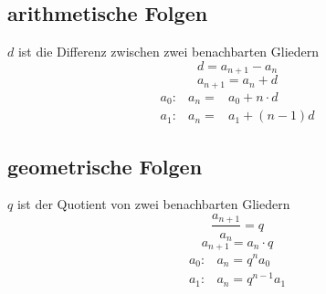 \subsection{arithmetische Folgen}
$d$ ist die Differenz zwischen zwei benachbarten Gliedern\\
\[ \boxed{d = a_{n+1} - a_n} \]
\[ \boxed{a_{n+1} = a_n + d} \]
\[ \boxed{ \begin{matrix} 
a_0 :& a_n =& a_0 + n \cdot d \\
a_1 :& a_n =& a_1 + (n - 1)d 
\end{matrix}}\]

\subsection{geometrische Folgen}
$q$ ist der Quotient von zwei benachbarten Gliedern\\
\[ \boxed{\frac{a_{n+1}}{a_n} = q} \]
\[ \boxed{a_{n+1} = a_n \cdot q} \]
\[ \boxed{\begin{array}{ll}
a_0 :& a_n = q^{n} a_0\\
a_1 :& a_n = q^{n-1} a_1
\end{array}} \]

\ifti
